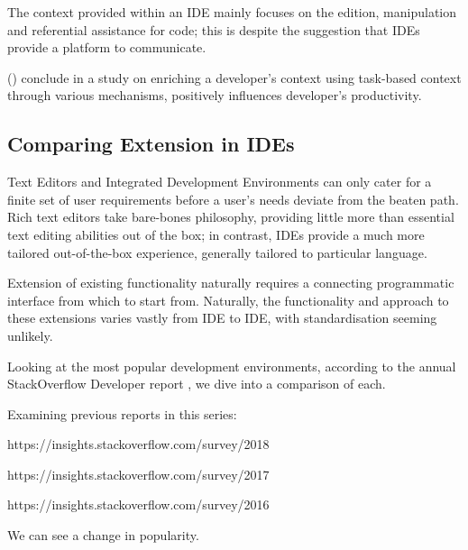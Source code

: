 The context provided within an IDE mainly focuses on the edition, manipulation and referential assistance for code; this is despite the suggestion that IDEs provide a platform to communicate.

\citeauthor{kersten2006using} () conclude in a study on enriching a developer's context using task-based context through various mechanisms, positively influences developer's productivity.

\subsection{Comparing Extension in IDEs}

Text Editors and Integrated Development Environments can only cater for a finite set of user requirements before a user's needs deviate from the beaten path. Rich text editors take bare-bones philosophy, providing little more than essential text editing abilities out of the box; in contrast, IDEs provide a much more tailored out-of-the-box experience, generally tailored to particular language. 

Extension of existing functionality naturally requires a connecting programmatic interface from which to start from. Naturally, the functionality and approach to these extensions varies vastly from IDE to IDE, with standardisation seeming unlikely. 

Looking at the most popular development environments, according to the annual StackOverflow Developer report \parencite{stackOverflowDevReport2019}, we dive into a comparison of each.

Examining previous reports in this series: 

https://insights.stackoverflow.com/survey/2018

https://insights.stackoverflow.com/survey/2017

https://insights.stackoverflow.com/survey/2016

We can see a change in popularity.








